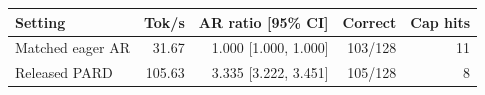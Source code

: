 \begin{tabular}{lrrrr}
\toprule
Setting & Tok/s & AR ratio [95\% CI] & Correct & Cap hits \\
\midrule
Matched eager AR & 31.67 & 1.000 [1.000, 1.000] & 103/128 & 11 \\
Released PARD & 105.63 & 3.335 [3.222, 3.451] & 105/128 & 8 \\
\bottomrule
\end{tabular}
